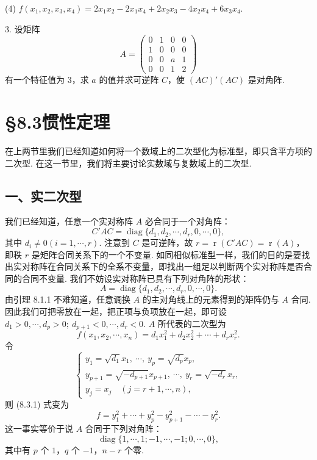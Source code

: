 \documentclass[UTF8, 12pt, fontset=fandol, oneside]{ctexart}
\begin{document}
(4) $f(x_1,x_2,x_3,x_4)=2x_1x_2-2x_1x_4+2x_2x_3-4x_2x_4+6x_3x_4$.

3. 设矩阵
\[
A=\left(\begin{array}{cccc}
0&1&0&0\\
1&0&0&0\\
0&0&a&1\\
0&0&1&2
\end{array}\right)
\]
有一个特征值为 3，求 $a$ 的值并求可逆阵 $C$，使 $(AC)'(AC)$ 是对角阵.

\section*{§8.3\quad 惯性定理}

在上两节里我们已经知道如何将一个数域上的二次型化为标准型，即只含平方项的二次型. 在这一节里，我们将主要讨论实数域与复数域上的二次型.

\subsection*{一、实二次型}

我们已经知道，任意一个实对称阵 $A$ 必合同于一个对角阵：
\[
C'AC=\operatorname{diag}\{d_1,d_2,\cdots,d_r,0,\cdots,0\},
\]
其中 $d_i\neq0(i=1,\cdots,r)$. 注意到 $C$ 是可逆阵，故 $r=\operatorname{r}(C'AC)=\operatorname{r}(A)$，即秩 $r$ 是矩阵合同关系下的一个不变量. 如同相似标准型一样，我们的目的是要找出实对称阵在合同关系下的全系不变量，即找出一组足以判断两个实对称阵是否合同的合同不变量. 我们不妨设实对称阵已具有下列对角阵的形状：
\[
A=\operatorname{diag}\{d_1,d_2,\cdots,d_r,0,\cdots,0\}.
\]
由引理 8.1.1 不难知道，任意调换 $A$ 的主对角线上的元素得到的矩阵仍与 $A$ 合同. 因此我们可把零放在一起，把正项与负项放在一起，即可设 $d_1>0,\cdots,d_p>0;\ d_{p+1}<0,\cdots,d_r<0$. $A$ 所代表的二次型为
\begin{equation}
f(x_1,x_2,\cdots,x_n)=d_1x_1^2+d_2x_2^2+\cdots+d_rx_r^2.
\tag{8.3.1}
\end{equation}
令
\[
\left\{\begin{array}{l}
y_1=\sqrt{d_1}x_1,\ \cdots,\ y_p=\sqrt{d_p}x_p,\\
y_{p+1}=\sqrt{-d_{p+1}}x_{p+1},\ \cdots,\ y_r=\sqrt{-d_r}x_r,\\
y_j=x_j\quad (j=r+1,\cdots,n),
\end{array}\right.
\]
则 (8.3.1) 式变为
\begin{equation}
f=y_1^2+\cdots+y_p^2-y_{p+1}^2-\cdots-y_r^2.
\tag{8.3.2}
\end{equation}
这一事实等价于说 $A$ 合同于下列对角阵：
\begin{equation}
\operatorname{diag}\{1,\cdots,1;-1,\cdots,-1;0,\cdots,0\},
\tag{8.3.3}
\end{equation}
其中有 $p$ 个 $1$，$q$ 个 $-1$，$n-r$ 个零.
\end{document}
